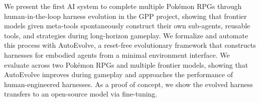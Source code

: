 We present the first AI system to complete multiple Pok\'{e}mon RPGs through human-in-the-loop harness evolution in the GPP project, showing that frontier models given meta-tools spontaneously construct their own sub-agents, reusable tools, and strategies during long-horizon gameplay. We formalize and automate this process with AutoEvolve, a reset-free evolutionary framework that constructs harnesses for embodied agents from a minimal environment interface. We evaluate across two Pok\'{e}mon RPGs and multiple frontier models, showing that AutoEvolve improves during gameplay and approaches the performance of human-engineered harnesses. As a proof of concept, we show the evolved harness transfers to an open-source model via fine-tuning.






